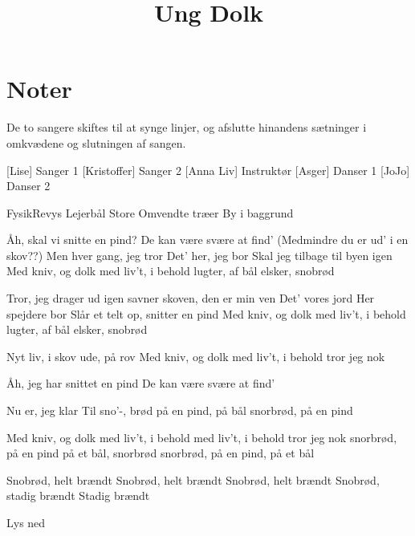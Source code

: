 \documentclass[a4paper,11pt]{article}
\title{Ung Dolk}
\begin{document}
\maketitle
\section*{Noter}
De to sangere skiftes til at synge linjer, og afslutte hinandens sætninger i omkvædene og slutningen af sangen.

\begin{roles}

[Lise] Sanger 1
[Kristoffer] Sanger 2
[Anna Liv] Instruktør
[Asger] Danser 1
[JoJo] Danser 2

\end{roles}

\begin{props}
     FysikRevys Lejerbål
     Store Omvendte træer
     By i baggrund
\end{props}

\begin{song}

Åh, skal vi snitte en pind?
De kan være svære at find' (Medmindre du er ud' i en skov??)
Men hver gang, jeg tror
Det' her, jeg bor
Skal jeg tilbage til byen igen
Med kniv, og dolk
med liv't, i behold
lugter, af bål
elsker, snobrød

Tror, jeg drager ud igen
savner skoven, den er min ven
Det' vores jord
Her spejdere bor
Slår et telt op, snitter en pind
Med kniv, og dolk
med liv't, i behold
lugter, af bål
elsker, snobrød

Nyt liv, i skov
ude, på rov
Med kniv, og dolk
med liv't, i behold
tror jeg nok

Åh, jeg har snittet en pind
De kan være svære at find'

Nu er, jeg klar
Til sno'-, brød på
en pind, på bål
snorbrød, på en pind

Med kniv, og dolk
med liv't, i behold
med liv't, i behold
tror jeg nok
snorbrød, på en pind
på et bål, snorbrød
snorbrød, på en pind, 
på et bål

Snobrød, helt brændt
Snobrød, helt brændt
Snobrød, helt brændt
Snobrød, stadig brændt
Stadig brændt

\scene Lys ned
\end{song}
\end{document}
